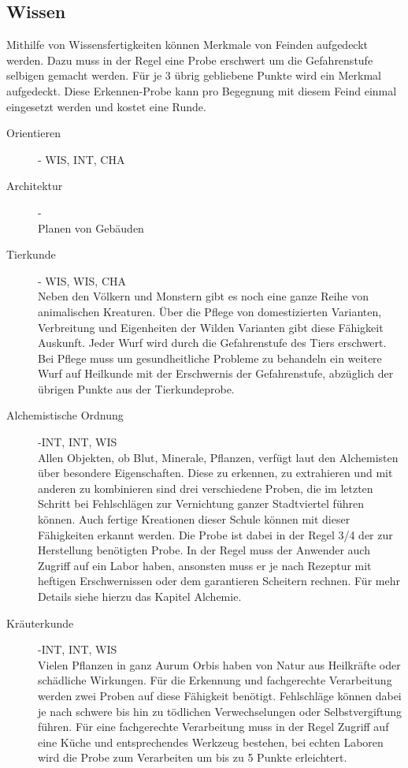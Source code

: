 \documentclass[a4paper,12pt,oneside]{book}
\begin{document}
\subsection{Wissen}
Mithilfe von Wissensfertigkeiten können Merkmale von Feinden aufgedeckt werden. Dazu muss in der Regel eine Probe erschwert um die Gefahrenstufe selbigen gemacht werden. Für je 3 übrig gebliebene Punkte wird ein Merkmal aufgedeckt. Diese Erkennen-Probe kann pro Begegnung mit diesem Feind einmal eingesetzt werden und kostet eine Runde.
\begin{description}
\item[Orientieren]- WIS, INT, CHA
\item[Architektur]-
\\Planen von Gebäuden
\item[Tierkunde]- WIS, WIS, CHA
\\Neben den Völkern und Monstern gibt es noch eine ganze Reihe von animalischen Kreaturen. Über die Pflege von domestizierten Varianten, Verbreitung und Eigenheiten der Wilden Varianten gibt diese Fähigkeit Auskunft. Jeder Wurf wird durch die Gefahrenstufe des Tiers erschwert. Bei Pflege muss um gesundheitliche Probleme zu behandeln ein weitere Wurf auf Heilkunde mit der Erschwernis der Gefahrenstufe, abzüglich der übrigen Punkte aus der Tierkundeprobe.
\item[Alchemistische Ordnung]-INT, INT, WIS
\\Allen Objekten, ob Blut, Minerale, Pflanzen, verfügt laut den Alchemisten über besondere Eigenschaften. Diese zu erkennen, zu extrahieren und mit anderen zu kombinieren sind drei verschiedene Proben, die im letzten Schritt bei Fehlschlägen zur Vernichtung ganzer Stadtviertel führen können. Auch fertige Kreationen dieser Schule können mit dieser Fähigkeiten erkannt werden. Die Probe ist dabei in der Regel 3/4 der zur Herstellung benötigten Probe. In der Regel muss der Anwender auch Zugriff auf ein Labor haben, ansonsten muss er je nach Rezeptur mit heftigen Erschwernissen oder dem garantieren Scheitern rechnen. Für mehr Details siehe hierzu das Kapitel Alchemie.
\item[Kräuterkunde]-INT, INT, WIS
\\Vielen Pflanzen in ganz Aurum Orbis haben von Natur aus Heilkräfte oder schädliche Wirkungen. Für die Erkennung und fachgerechte Verarbeitung werden zwei Proben auf diese Fähigkeit benötigt. Fehlschläge können dabei je nach schwere bis hin zu tödlichen Verwechselungen oder Selbstvergiftung führen. Für eine fachgerechte Verarbeitung muss in der Regel Zugriff auf eine Küche und entsprechendes Werkzeug bestehen, bei echten Laboren wird die Probe zum Verarbeiten um bis zu 5 Punkte erleichtert. 

\end{description}
\end{document}
